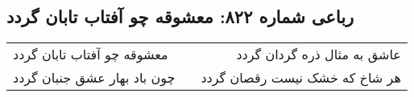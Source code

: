 \begin{center}
\section*{رباعی شماره ۸۲۲: معشوقه چو آفتاب تابان گردد}
\label{sec:0822}
\begin{longtable}{l p{0.5cm} r}
معشوقه چو آفتاب تابان گردد
&&
عاشق به مثال ذره گردان گردد
\\
چون باد بهار عشق جنبان گردد
&&
هر شاخ که خشک نیست رقصان گردد
\\
\end{longtable}
\end{center}
